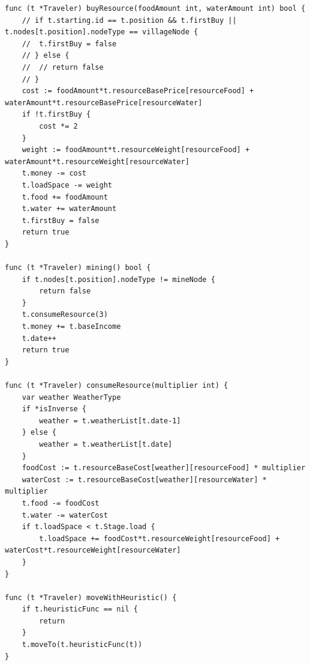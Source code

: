 \documentclass[a4paper]{ctexart}
\begin{document}
\begin{verbatim}
func (t *Traveler) buyResource(foodAmount int, waterAmount int) bool {
    // if t.starting.id == t.position && t.firstBuy || t.nodes[t.position].nodeType == villageNode {
    // 	t.firstBuy = false
    // } else {
    // 	// return false
    // }
    cost := foodAmount*t.resourceBasePrice[resourceFood] + waterAmount*t.resourceBasePrice[resourceWater]
    if !t.firstBuy {
        cost *= 2
    }
    weight := foodAmount*t.resourceWeight[resourceFood] + waterAmount*t.resourceWeight[resourceWater]
    t.money -= cost
    t.loadSpace -= weight
    t.food += foodAmount
    t.water += waterAmount
    t.firstBuy = false
    return true
}

func (t *Traveler) mining() bool {
    if t.nodes[t.position].nodeType != mineNode {
        return false
    }
    t.consumeResource(3)
    t.money += t.baseIncome
    t.date++
    return true
}

func (t *Traveler) consumeResource(multiplier int) {
    var weather WeatherType
    if *isInverse {
        weather = t.weatherList[t.date-1]
    } else {
        weather = t.weatherList[t.date]
    }
    foodCost := t.resourceBaseCost[weather][resourceFood] * multiplier
    waterCost := t.resourceBaseCost[weather][resourceWater] * multiplier
    t.food -= foodCost
    t.water -= waterCost
    if t.loadSpace < t.Stage.load {
        t.loadSpace += foodCost*t.resourceWeight[resourceFood] + waterCost*t.resourceWeight[resourceWater]
    }
}

func (t *Traveler) moveWithHeuristic() {
    if t.heuristicFunc == nil {
        return
    }
    t.moveTo(t.heuristicFunc(t))
}
\end{verbatim}
\end{document}
